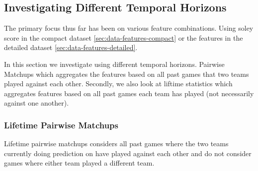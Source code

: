 \documentclass{article} %
\begin{document}
\subsection{Investigating Different Temporal Horizons}
\label{sec:temporal-horizons}

The primary focus thus far has been on various feature combinations.
Using soley score in the compact dataset \ref{sec:data-features-compact} or the features in the detailed dataset \ref{sec:data-features-detailed}.

In this section we investigate using different temporal horizons.
Pairwise Matchups which aggregates the features based on all past games that two teams played against each other.
Secondly, we also look at liftime statistics which aggregates features based on all past games each team has played (not necessarily against one another).

\subsubsection{Lifetime Pairwise Matchups}

Lifetime pairwise matchups considers all past games where the two teams currently doing prediction on have played against each other and do not consider games where either team played a different team.
\end{document}
